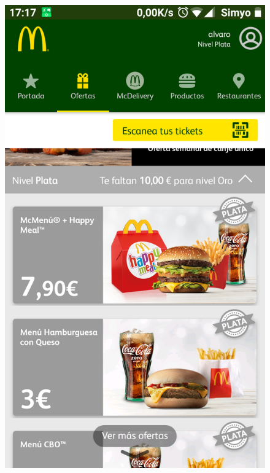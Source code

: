 \documentclass[twoside]{report}
\begin{document}
\begin{figure}[H]
\begin{center}
\includegraphics[scale=0.25]{images/restaurantes/mcdo0.png}

\end{center}
\end{figure}
\end{document}
